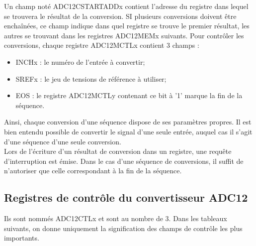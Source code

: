 Un champ noté ADC12CSTARTADDx contient l'adresse du registre dans lequel se trouvera le résultat de la conversion. SI plusieurs conversions doivent être enchaînées, ce champ indique dans quel registre se trouve le premier résultat, les autres se trouvant dans les registres ADC12MEMx suivants.
Pour contrôler les conversions, chaque registre ADC12MCTLx contient 3 champs :
\begin{itemize}[label=\textbullet,font=\small]
\item INCHx : le numéro de l'entrée à convertir;
\item SREFx : le jeu de tensions de référence à utiliser;
\item EOS : le registre ADC12MCTLy contenant ce bit à '1' marque la fin de la séquence.
\end{itemize}

Ainsi, chaque conversion d'une séquence dispose de ses paramètres propres. Il est bien entendu possible de convertir le signal d'une seule entrée, auquel cas il s'agit d'une séquence d'une seule conversion.\\

Lors de l'écriture d'un résultat de conversion dans un registre, une requête d'interruption est émise. Dans le cas d'une séquence de conversions, il suffit de n'autoriser que celle correspondant à la fin de la séquence.

\pagebreak
\subsection{Registres de contrôle du convertisseur ADC12}

Ils sont nommés ADC12CTLx et sont au nombre de 3. Dans les tableaux suivants, on donne uniquement la signification des champs de contrôle les plus importants.

